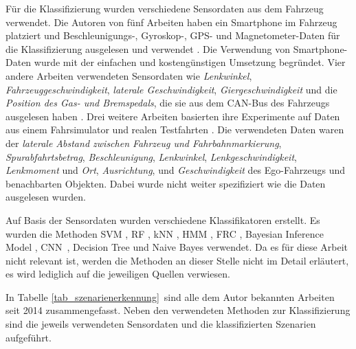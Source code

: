 Für die Klassifizierung wurden verschiedene Sensordaten aus dem Fahrzeug verwendet. Die Autoren von fünf Arbeiten haben ein Smartphone im Fahrzeug platziert und Beschleunigungs-, Gyroskop-, GPS- und Magnetometer-Daten für die Klassifizierung ausgelesen und verwendet \cite{xie2018driving, cervantes2016vehicle, woo2016manoeuvre, camlica2016feature, arroyo2016adaptive}. Die Verwendung von Smartphone-Daten wurde mit der einfachen und kostengünstigen Umsetzung begründet. Vier andere Arbeiten verwendeten Sensordaten wie \textit{Lenkwinkel}, \textit{Fahrzeuggeschwindigkeit}, \textit{laterale Geschwindigkeit}, \textit{Giergeschwindigkeit} und die \textit{Position des Gas- und Bremspedals}, die sie aus dem CAN-Bus des Fahrzeugs ausgelesen haben \cite{zheng2017lane, zheng2015non, li2015lane, zheng2014threshold}. Drei weitere Arbeiten basierten ihre Experimente auf Daten aus einem Fahrsimulator \cite{sun2017robust, zheng2016drivers} und realen Testfahrten \cite{gruner2017spatiotemporal}. Die verwendeten Daten waren der \textit{laterale Abstand zwischen Fahrzeug und Fahrbahnmarkierung}, \textit{Spurabfahrtsbetrag}, \textit{Beschleunigung}, \textit{Lenkwinkel}, \textit{Lenkgeschwindigkeit}, \textit{Lenkmoment} und \textit{Ort}, \textit{Ausrichtung}, und \textit{Geschwindigkeit} des Ego-Fahrzeugs und benachbarten Objekten. Dabei wurde nicht weiter spezifiziert wie die Daten ausgelesen wurden.

Auf Basis der Sensordaten wurden verschiedene Klassifikatoren erstellt. Es wurden die Methoden \ac{SVM} \cite{sun2017robust, cervantes2016vehicle, woo2016manoeuvre, camlica2016feature, zheng2016drivers, zheng2015non}, \ac{RF} \cite{xie2018driving, cervantes2016vehicle, zheng2016drivers}, \ac{kNN} \cite{zheng2017lane, camlica2016feature, zheng2016drivers}, \ac{HMM} \cite{zheng2017lane, li2015lane}, \ac{FRC} \cite{cervantes2016vehicle, arroyo2016adaptive}, Bayesian Inference Model \cite{sun2017robust}, \ac{CNN} \cite{gruner2017spatiotemporal}, Decision Tree \cite{zheng2014threshold} und Naive Bayes \cite{camlica2016feature} verwendet. Da es für diese Arbeit nicht relevant ist, werden die Methoden an dieser Stelle nicht im Detail erläutert, es wird lediglich auf die jeweiligen Quellen verwiesen.

In Tabelle \ref{tab_szenarienerkennung} sind alle dem Autor bekannten Arbeiten seit 2014 zusammengefasst. Neben den verwendeten Methoden zur Klassifizierung sind die jeweils verwendeten Sensordaten und die klassifizierten Szenarien aufgeführt.

